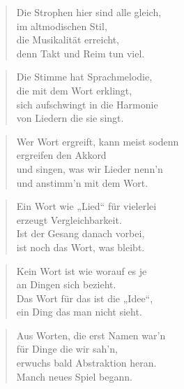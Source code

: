 \documentclass[10pt,a4paper]{article}
\begin{document}
\begin{paracol}{2}
\begin{verse}
Die Strophen hier sind alle gleich, \\
im altmodischen Stil, \\
die Musikalität erreicht, \\
denn Takt und Reim tun viel. \\
\end{verse}

\begin{verse}
Die Stimme hat Sprachmelodie, \\
die mit dem Wort erklingt, \\
sich aufschwingt in die Harmonie \\
von Liedern die sie singt. \\
\end{verse}

\begin{verse}
Wer Wort ergreift, kann meist sodenn \\
ergreifen den Akkord \\
und singen, was wir Lieder nenn’n \\
und anstimm’n mit dem Wort. \\
\end{verse}

\begin{verse}
Ein Wort wie „Lied“ für vielerlei \\
erzeugt Vergleichbarkeit. \\
Ist der Gesang danach vorbei, \\
ist noch das Wort, was bleibt. \\
\end{verse}

\begin{verse}
Kein Wort ist wie worauf es je \\
an Dingen sich bezieht. \\
Das Wort für das ist die „Idee“, \\
ein Ding das man nicht sieht. \\
\end{verse}

\begin{verse}
Aus Worten, die erst Namen war’n \\
für Dinge die wir sah’n, \\
erwuchs bald Abstraktion heran. \\
Manch neues Spiel begann. \\
\end{verse}


\end{paracol}
\end{document}
